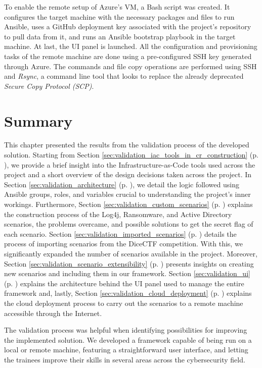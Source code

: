 To enable the remote setup of Azure's VM, a Bash script was created. It configures the target machine with the necessary packages and files to run Ansible, uses a GitHub deployment key associated with the project's repository to pull data from it, and runs an Ansible bootstrap playbook in the target machine. At last, the UI panel is launched. All the configuration and provisioning tasks of the remote machine are done using a pre-configured SSH key generated through Azure. The commands and file copy operations are performed using SSH and \textit{Rsync}, a command line tool that looks to replace the already deprecated \textit{Secure Copy Protocol (SCP)}.


\section{Summary} \label{sec:validation_summary}

This chapter presented the results from the validation process of the developed solution. Starting from Section \ref{sec:validation_iac_tools_in_cr_construction} (p. \pageref{sec:validation_iac_tools_in_cr_construction}), we provide a brief insight into the Infrastructure-as-Code tools used across the project and a short overview of the design decisions taken across the project. In Section \ref{sec:validation_architecture} (p. \pageref{sec:validation_architecture}), we detail the logic followed using Ansible groups, roles, and variables crucial to understanding the project's inner workings. Furthermore, Section \ref{sec:validation_custom_scenarios} (p. \pageref{sec:validation_custom_scenarios}) explains the construction process of the Log4j, Ransomware, and Active Directory scenarios, the problems overcame, and possible solutions to get the secret flag of each scenario. Section \ref{sec:validation_imported_scenarios} (p. \pageref{sec:validation_imported_scenarios}) details the process of importing scenarios from the DiceCTF competition. With this, we significantly expanded the number of scenarios available in the project. Moreover, Section \ref{sec:validation_scenario_extensibility} (p. \pageref{sec:validation_scenario_extensibility}) presents insights on creating new scenarios and including them in our framework. Section \ref{sec:validation_ui} (p. \pageref{sec:validation_ui}) explains the architecture behind the UI panel used to manage the entire framework and, lastly, Section \ref{sec:validation_cloud_deployment} (p. \pageref{sec:validation_cloud_deployment}) explains the cloud deployment process to carry out the scenarios to a remote machine accessible through the Internet.

The validation process was helpful when identifying possibilities for improving the implemented solution. We developed a framework capable of being run on a local or remote machine, featuring a straightforward user interface, and letting the trainees improve their skills in several areas across the cybersecurity field.